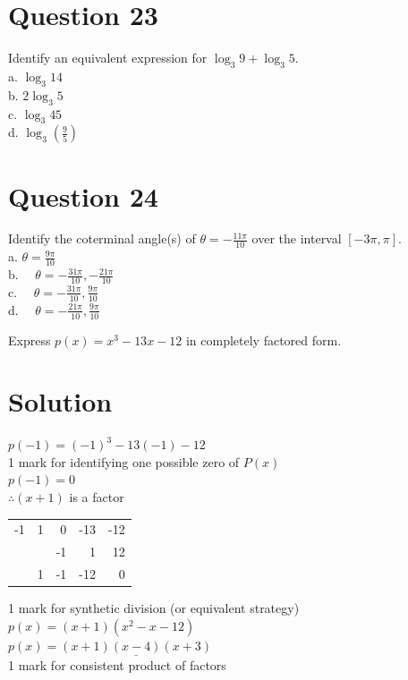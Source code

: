 \documentclass[10pt]{article}
\begin{document}
\section*{Question 23}
Identify an equivalent expression for $\log _{3} 9+\log _{3} 5$.\\
a. $\log _{3} 14$\\
b. $2 \log _{3} 5$\\
c. $\log _{3} 45$\\
d. $\log _{3}\left(\frac{9}{5}\right)$

\section*{Question 24}
Identify the coterminal angle(s) of $\theta=-\frac{11 \pi}{10}$ over the interval $[-3 \pi, \pi]$.\\
a. $\theta=\frac{9 \pi}{10}$\\
b. $\quad \theta=-\frac{31 \pi}{10},-\frac{21 \pi}{10}$\\
c. $\quad \theta=-\frac{31 \pi}{10}, \frac{9 \pi}{10}$\\
d. $\quad \theta=-\frac{21 \pi}{10}, \frac{9 \pi}{10}$

Express $p(x)=x^{3}-13 x-12$ in completely factored form.

\section*{Solution}
$p(-1)=(-1)^{3}-13(-1)-12$\\
1 mark for identifying one possible zero of $P(x)$\\
$p(-1)=0$\\
$\therefore(x+1)$ is a factor

\begin{center}
\begin{tabular}{r|rrrr}
-1 & 1 & 0 & -13 & -12 \\
 &  & -1 & 1 & 12 \\
\hline
 & 1 & -1 & -12 & 0 \\
\hline
\end{tabular}
\end{center}

1 mark for synthetic division (or equivalent strategy)\\
$p(x)=(x+1)\left(x^{2}-x-12\right)$\\
$p(x)=\underline{(x+1)(x-4)(x+3)}$\\
1 mark for consistent product of factors
\end{document}
